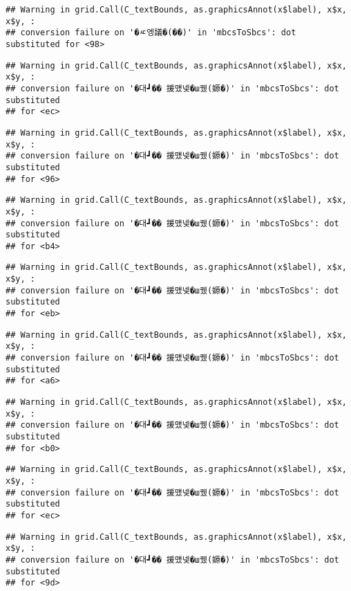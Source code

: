 \documentclass[
]{article}
\begin{document}
\begin{verbatim}
## Warning in grid.Call(C_textBounds, as.graphicsAnnot(x$label), x$x, x$y, :
## conversion failure on '�ㅼ엥議�(��)' in 'mbcsToSbcs': dot substituted for <98>
\end{verbatim}

\begin{verbatim}
## Warning in grid.Call(C_textBounds, as.graphicsAnnot(x$label), x$x, x$y, :
## conversion failure on '�대┛�� 援먰넻�ш퀬(嫄�)' in 'mbcsToSbcs': dot substituted
## for <ec>
\end{verbatim}

\begin{verbatim}
## Warning in grid.Call(C_textBounds, as.graphicsAnnot(x$label), x$x, x$y, :
## conversion failure on '�대┛�� 援먰넻�ш퀬(嫄�)' in 'mbcsToSbcs': dot substituted
## for <96>
\end{verbatim}

\begin{verbatim}
## Warning in grid.Call(C_textBounds, as.graphicsAnnot(x$label), x$x, x$y, :
## conversion failure on '�대┛�� 援먰넻�ш퀬(嫄�)' in 'mbcsToSbcs': dot substituted
## for <b4>
\end{verbatim}

\begin{verbatim}
## Warning in grid.Call(C_textBounds, as.graphicsAnnot(x$label), x$x, x$y, :
## conversion failure on '�대┛�� 援먰넻�ш퀬(嫄�)' in 'mbcsToSbcs': dot substituted
## for <eb>
\end{verbatim}

\begin{verbatim}
## Warning in grid.Call(C_textBounds, as.graphicsAnnot(x$label), x$x, x$y, :
## conversion failure on '�대┛�� 援먰넻�ш퀬(嫄�)' in 'mbcsToSbcs': dot substituted
## for <a6>
\end{verbatim}

\begin{verbatim}
## Warning in grid.Call(C_textBounds, as.graphicsAnnot(x$label), x$x, x$y, :
## conversion failure on '�대┛�� 援먰넻�ш퀬(嫄�)' in 'mbcsToSbcs': dot substituted
## for <b0>
\end{verbatim}

\begin{verbatim}
## Warning in grid.Call(C_textBounds, as.graphicsAnnot(x$label), x$x, x$y, :
## conversion failure on '�대┛�� 援먰넻�ш퀬(嫄�)' in 'mbcsToSbcs': dot substituted
## for <ec>
\end{verbatim}

\begin{verbatim}
## Warning in grid.Call(C_textBounds, as.graphicsAnnot(x$label), x$x, x$y, :
## conversion failure on '�대┛�� 援먰넻�ш퀬(嫄�)' in 'mbcsToSbcs': dot substituted
## for <9d>
\end{verbatim}
\end{document}
